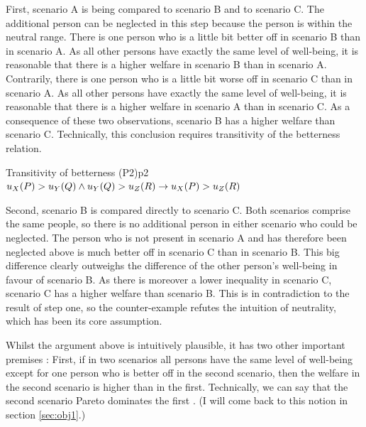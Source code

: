 First, scenario A is being compared to scenario B and to scenario C. The additional person can be neglected in this step because the person is within the neutral range. There is one person who is a little bit better off in scenario B than in scenario A. As all other persons have exactly the same level of well-being, it is reasonable that there is a higher welfare in scenario B than in scenario A. Contrarily, there is one person who is a little bit worse off in scenario C than in scenario A. As all other persons have exactly the same level of well-being, it is reasonable that there is a higher welfare in scenario A than in scenario C. As a consequence of these two observations, scenario B has a higher welfare than scenario C. Technically, this conclusion requires transitivity of the betterness relation.  

\begin{Premise}{Transitivity of betterness (P2)}{p2}
$
  u_X(P) > u_Y(Q) \wedge u_Y(Q) > u_Z(R) \\
  \rightarrow
  u_X(P) > u_Z(R)
$
\end{Premise}

Second, scenario B is compared directly to scenario C. Both scenarios comprise the same people, so there is no additional person in either scenario who could be neglected. The person who is not present in scenario A and has therefore been neglected above is much better off in scenario C than in scenario B. This big difference clearly outweighs the difference of the other person’s well-being in favour of scenario B. As there is moreover a lower inequality in scenario C, scenario C has a higher welfare than scenario B. This is in contradiction to the result of step one, so the counter-example refutes the intuition of neutrality, which has been its core assumption.  

Whilst the argument above is intuitively plausible, it has two other important premises \cite[p.~177f]{broome_2012}: First, if in two scenarios all persons have the same level of well-being except for one person who is better off in the second scenario, then the welfare in the second scenario is higher than in the first. Technically, we can say that the second scenario Pareto dominates the first \cite{osborne_1997}. (I will come back to this notion in section \ref{sec:obj1}.)

